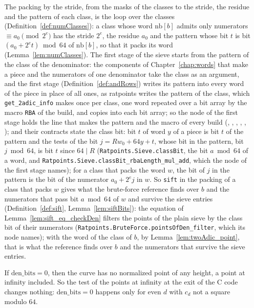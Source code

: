 The packing by the stride, from the masks of the classes to the stride, the residue and the pattern
of each class, is the loop over the classes (Definition~\ref{def:numClasses}): a class whose word
$\mathrm{nb}[b]$ admits only numerators $\equiv a_0 \pmod{2^e}$ has the stride $2^e$, the residue
$a_0$ and the pattern whose bit $t$ is bit $(a_0 + 2^e t) \bmod 64$ of $\mathrm{nb}[b]$, so that it
packs its word (Lemma~\ref{lem:numClasses}). The first stage of the sieve starts from the pattern of
the class of the denominator: the components of Chapter~\ref{chap:words} that make a piece and the
numerators of one denominator take the class as an argument, and the first stage
(Definition~\ref{def:andRows}) writes its pattern into every word of the piece in place of all ones,
as ratpoints writes the pattern of the class, which \verb|get_2adic_info| makes once per class, one
word repeated over a bit array by the macro \verb|RBA| of the build, and copies into each bit array;
so the node of the first stage holds the line that makes the pattern and the macro of every build
(, ,
, ,
, ); and their contracts state the
class bit: bit $t$ of word $y$ of a piece is bit $t$ of the pattern and the tests of the bit
$j = R w_0 + 64 y + t$, whose bit in the pattern, bit $j \bmod 64$, is bit $t$ since $64 \mid R$
(\verb|Ratpoints.Sieve.classBit|, the bit $a \bmod 64$ of a word, and
\verb|Ratpoints.Sieve.classBit_rbaLength_mul_add|, which the node of the first stage names); for a
class that packs the word $w$, the bit of $j$ in the pattern is the bit of the numerator
$a_0 + 2^e j$ in $w$. So \verb|sift| in the packing of a class that packs $w$ gives what the
brute-force reference finds over $b$ and the numerators that pass bit $a \bmod 64$ of $w$ and
survive the sieve entries (Definition~\ref{def:sift}, Lemma~\ref{lem:siftBits}): the equation of
Lemma~\ref{lem:sift_eq_checkDen} filters the points of the plain sieve by the class bit of their
numerators (\verb|Ratpoints.BruteForce.pointsOfDen_filter|, which its node names); with the word of
the class of $b$, by Lemma~\ref{lem:twoAdic_point}, that is what the reference finds over $b$ and
the numerators that survive the sieve entries.

\begin{lemma}\label{lem:twoAdic_exit}
  \leanok
  If $\mathrm{den\_bits} = 0$, then the curve has no normalized point of any height, a point at
  infinity included. So the test of the points at infinity at the exit of the C code changes
  nothing: $\mathrm{den\_bits} = 0$ happens only for even $d$ with $c_d$ not a square modulo $64$.
\end{lemma}

